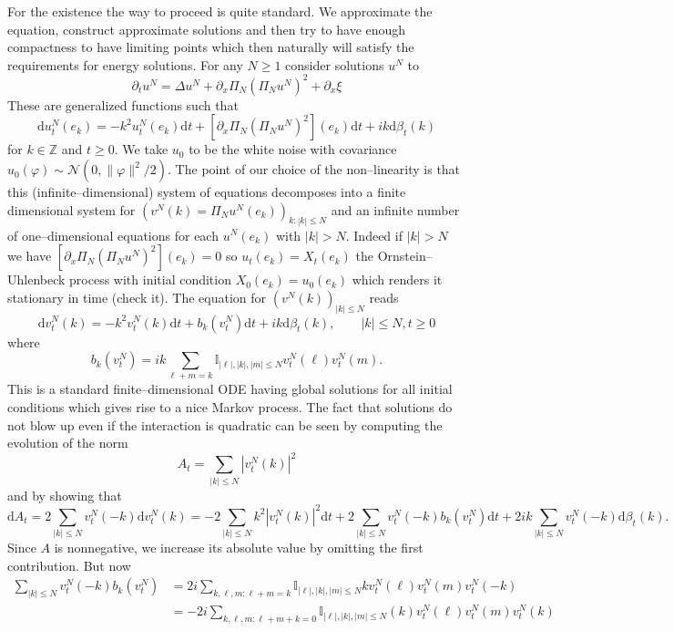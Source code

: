 \documentclass[a4paper,11pt]{article}
\newcommand{\mathd}{\mathrm{d}}
\begin{document}
For the existence the way to proceed is quite standard. We approximate the
equation, construct approximate solutions and then try to have enough
compactness to have limiting points which then naturally will satisfy the
requirements for energy solutions. For any $N \geqslant 1$ consider solutions
$u^N$ to
\[ \partial_t u^N = \Delta u^N + \partial_x \Pi_N (\Pi_N u^N)^2 + \partial_x
   \xi \]
These are generalized functions such that
\[ \mathd u^N_t (e_k) = - k^2 u^N_t (e_k) \mathd t + [\partial_x \Pi_N (\Pi_N
   u^N)^2] (e_k) \mathd t + ik \mathd \beta_t (k) \]
for $k \in \mathbb{Z}$ and $t \geqslant 0$. We take $u_0$ to be the white
noise with covariance $u_0 (\varphi) \sim \mathcal{N} (0, \| \varphi \|^2 /
2)$. The point of our choice of the non--linearity is that this
(infinite--dimensional) system of equations decomposes into a finite
dimensional system for $(v^N (k) = \Pi_N u^N (e_k))_{k : | k | \leqslant N}$
and an infinite number of one--dimensional equations for each $u^N (e_k)$ with
$| k | > N$. Indeed if $| k | > N$ we have $[\partial_x \Pi_N (\Pi_N u^N)^2]
(e_k) = 0$ so $u_t (e_k) = X_t (e_k)$ the Ornstein--Uhlenbeck process with
initial condition $X_0(e_k) = u_0(e_k)$ which renders it stationary in time (check it).
The equation for $(v^N (k))_{| k | \leqslant N}$ reads
\[ \mathd v^N_t (k) = - k^2 v^N_t (k) \mathd t + b_k (v^N_t) \mathd t + ik
   \mathd \beta_t (k), \hspace{2em} | k | \leqslant N, t \geqslant 0 \]
where
\[ b_k (v^N_t) = ik \sum_{\ell + m = k} \mathbb{I}_{| \ell |, | k |, | m |
   \leqslant N} v^N_t (\ell) v^N_t (m) . \]
This is a standard finite--dimensional ODE having global solutions for all
initial conditions which gives rise to a nice Markov process. The fact that
solutions do not blow up even if the interaction is quadratic can be seen
by computing the evolution of the norm
\[ A_t = \sum_{| k | \leqslant N} | v^N_t (k) |^2 \]
and by showing that
\[ \mathd A_t = 2 \sum_{| k | \leqslant N} v^N_t (- k) \mathd v^N_t (k) = -
   2 \sum_{|k| \le N} k^2 |v^N_t(k)|^2 \mathd t + 2 \sum_{| k | \leqslant N} v^N_t (- k) b_k (v^N_t)
   \mathd t + 2  i  k \sum_{| k | \leqslant N} v^N_t (- k) \mathd \beta_t
   (k). \]
Since $A$ is nonnegative, we increase its absolute value by omitting the first contribution. But now
\begin{align*}
   \sum_{| k | \leqslant N} v^N_t (- k) b_k (v^N_t) & = 2  i  \sum_{k, \ell, m : \ell + m = k} \mathbb{I}_{| \ell |, | k |, | m | \leqslant N} kv^N_t (\ell) v^N_t (m) v^N_t (- k) \\
    & = - 2  i  \sum_{k, \ell, m : \ell + m + k = 0} \mathbb{I}_{| \ell |, | k |, | m | \leqslant N}  (k) v^N_t (\ell) v^N_t (m) v^N_t (k)
\end{align*}
\end{document}
